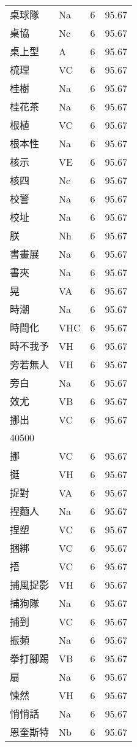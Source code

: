 \documentclass[twocolumn]{book}
\begin{document}
\begin{supertabular}{llrr}
桌球隊 & Na & 6 &  95.67\\
桌協 & Nc & 6 &  95.67\\
桌上型 & A & 6 &  95.67\\
梳理 & VC & 6 &  95.67\\
桂樹 & Na & 6 &  95.67\\
桂花茶 & Na & 6 &  95.67\\
根植 & VC & 6 &  95.67\\
根本性 & Na & 6 &  95.67\\
核示 & VE & 6 &  95.67\\
核四 & Nc & 6 &  95.67\\
校警 & Na & 6 &  95.67\\
校址 & Na & 6 &  95.67\\
朕 & Nh & 6 &  95.67\\
書畫展 & Na & 6 &  95.67\\
書夾 & Na & 6 &  95.67\\
晃 & VA & 6 &  95.67\\
時潮 & Na & 6 &  95.67\\
時間化 & VHC & 6 &  95.67\\
時不我予 & VH & 6 &  95.67\\
旁若無人 & VH & 6 &  95.67\\
旁白 & Na & 6 &  95.67\\
效尤 & VB & 6 &  95.67\\
挪出 & VC & 6 &  95.67\\
40500\\
挪 & VC & 6 &  95.67\\
挺 & VH & 6 &  95.67\\
捉對 & VA & 6 &  95.67\\
捏麵人 & Na & 6 &  95.67\\
捏塑 & VC & 6 &  95.67\\
捆綁 & VC & 6 &  95.67\\
捂 & VC & 6 &  95.67\\
捕風捉影 & VH & 6 &  95.67\\
捕狗隊 & Na & 6 &  95.67\\
捕到 & VC & 6 &  95.67\\
振頻 & Na & 6 &  95.67\\
拳打腳踢 & VB & 6 &  95.67\\
扇 & Na & 6 &  95.67\\
悚然 & VH & 6 &  95.67\\
悄悄話 & Na & 6 &  95.67\\
恩奎斯特 & Nb & 6 &  95.67\\

\end{supertabular}
\end{document}
